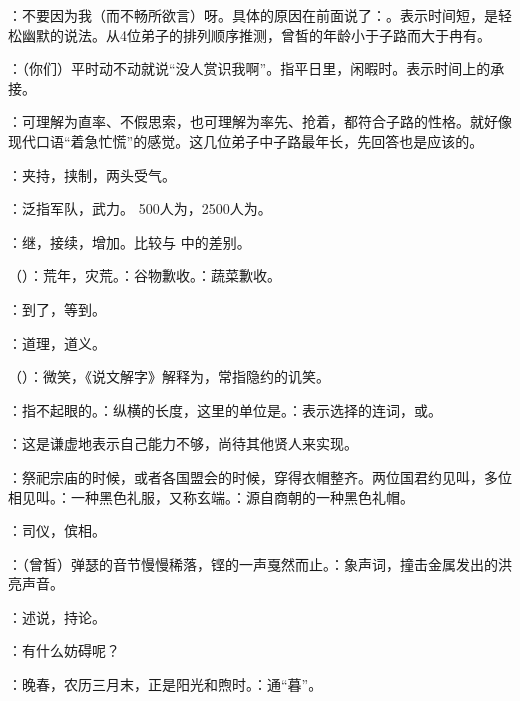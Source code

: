 {
\item {}：不要因为我（而不畅所欲言）呀。具体的原因在前面说了：。表示时间短，是轻松幽默的说法。从4位弟子的排列顺序推测，曾皙的年龄小于子路而大于冉有。
\item {}：（你们）平时动不动就说“没人赏识我啊”。指平日里，闲暇时。表示时间上的承接。
\item {}：可理解为直率、不假思索，也可理解为率先、抢着，都符合子路的性格。就好像现代口语“着急忙慌”的感觉。这几位弟子中子路最年长，先回答也是应该的。%
\item {}：夹持，挟制，两头受气。
\item {}：泛指军队，武力。 500人为，2500人为。
\item {}：继，接续，增加。比较与  中的差别。
\item {}（）：荒年，灾荒。：谷物歉收。：蔬菜歉收。
\item {}：到了，等到。
\item {}：道理，道义。
\item {}（）：微笑，《说文解字》解释为，常指隐约的讥笑。
\item {}：指不起眼的。：纵横的长度，这里的单位是。：表示选择的连词，或。
\item {}：这是谦虚地表示自己能力不够，尚待其他贤人来实现。
\item {}：祭祀宗庙的时候，或者各国盟会的时候，穿得衣帽整齐。两位国君约见叫，多位相见叫。：一种黑色礼服，又称玄端。：源自商朝的一种黑色礼帽。
\item {}：司仪，傧相。
\item {}：（曾皙）弹瑟的音节慢慢稀落，铿的一声戛然而止。：象声词，撞击金属发出的洪亮声音。
\item {}：述说，持论。
\item {}：有什么妨碍呢？
\item {}：晚春，农历三月末，正是阳光和煦时。：通“暮”。

}
